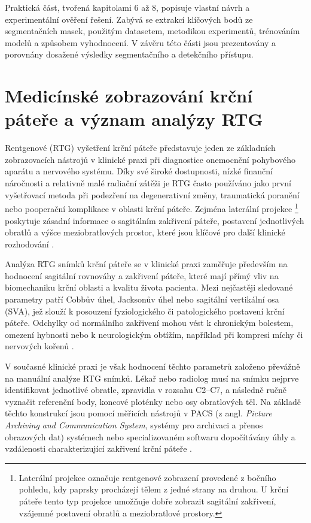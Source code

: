 \documentclass[male,czech,api_bc]{kitheses}
\begin{document}
Praktická část, tvořená kapitolami 6 až 8, popisuje vlastní návrh a experimentální ověření řešení. Zabývá se extrakcí klíčových bodů ze segmentačních masek, použitým datasetem, metodikou experimentů, trénováním modelů a způsobem vyhodnocení. V závěru této části jsou prezentovány a porovnány dosažené výsledky segmentačního a detekčního přístupu.

\chapter{Medicínské zobrazování krční páteře a význam analýzy RTG}

Rentgenové (RTG) vyšetření krční páteře představuje jeden ze základních zobrazovacích nástrojů v klinické praxi při diagnostice onemocnění pohybového aparátu a nervového systému. Díky své široké dostupnosti, nízké finanční náročnosti a relativně malé radiační zátěži je RTG často používáno jako první vyšetřovací metoda při podezření na degenerativní změny, traumatická poranění nebo pooperační komplikace v oblasti krční páteře. Zejména laterální projekce \footnote{Laterální projekce označuje rentgenové zobrazení provedené z bočního pohledu, kdy paprsky procházejí tělem z jedné strany na druhou. U krční páteře tento typ projekce umožňuje dobře zobrazit sagitální zakřivení, vzájemné postavení obratlů a meziobratlové prostory.} poskytuje zásadní informace o sagitálním zakřivení páteře, postavení jednotlivých obratlů a výšce meziobratlových prostor, které jsou klíčové pro další klinické rozhodování \cite{Scheer2013}.

Analýza RTG snímků krční páteře se v klinické praxi zaměřuje především na hodnocení sagitální rovnováhy a zakřivení páteře, které mají přímý vliv na biomechaniku krční oblasti a kvalitu života pacienta. Mezi nejčastěji sledované parametry patří Cobbův úhel, Jacksonův úhel nebo sagitální vertikální osa (SVA), jež slouží k posouzení fyziologického či patologického postavení krční páteře. Odchylky od normálního zakřivení mohou vést k chronickým bolestem, omezení hybnosti nebo k neurologickým obtížím, například při kompresi míchy či nervových kořenů \cite{Scheer2013}.

V současné klinické praxi je však hodnocení těchto parametrů založeno převážně na manuální analýze RTG snímků. Lékař nebo radiolog musí na snímku nejprve identifikovat jednotlivé obratle, zpravidla v rozsahu C2–C7, a následně ručně vyznačit referenční body, koncové ploténky nebo osy obratlových těl. Na základě těchto konstrukcí jsou pomocí měřicích nástrojů v PACS (z angl. \textit{Picture Archiving and Communication System}, systémy pro archivaci 
a přenos obrazových dat) systémech nebo specializovaném softwaru dopočítávány úhly a vzdálenosti charakterizující zakřivení krční páteře \cite{Scheer2013}.
\end{document}
